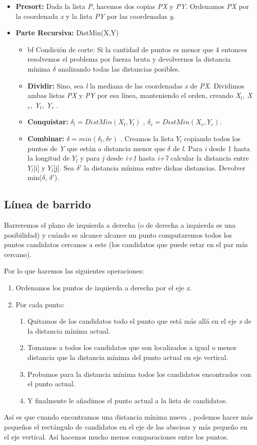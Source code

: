 \begin{itemize}
	\item {\bf Presort:} Dada la lista {\em P}, hacemos dos copias {\em PX} y {\em PY}. Ordenamos {\em PX} por la coordenada {\em x} y la lista {\em PY} por las coordenadas {\em y}.
	\item {\bf Parte Recursiva:} DistMin(X,Y)
	\begin{itemize}
		\item {bf Condición de corte:} Si la cantidad de puntos es menor que 4 entonces resolvemos el problema por fuerza bruta y devolvernos la distancia mínima $\delta$ analizando todas las distancias posibles.
		\item {\bf Dividir:} Sino, sea {\em l} la mediana de las coordenadas {\em x} de {\em PX}. Dividimos ambas listas {\em PX} y {\em PY} por esa línea, manteniendo el orden, creando {\em X$_{l}$, X$_{r}$, Y$_{l}$, Y$_{r}$ }.
		\item {\bf Conquistar:} $\delta_{l}=DistMin(X_{l},Y_{l})$ , $\delta_{r}=DistMin(X_{r},Y_{r})$.
		\item {\bf Combinar:} $\delta=min(\delta_{l}, \delta{r})$ . Creamos la lista $Y_l$ copiando 
		todos los puntos de {\em Y} que están a distancia menor que $\delta$ de {\em l}. Para {\em i} 
		desde 1 hasta la longitud de $Y_l$ y para {\em j} desde {\em i+1} hasta {\em i+7} calcular 
		la distancia entre $Y_l$[i] y $Y_l$[j]. Sea $\delta'$ la distancia mínima entre dichas 
		distancias. Devolver min($\delta$, $\delta'$).
	\end{itemize}
\end{itemize}

\subsection{Línea de barrido}

Barreremos el plano de izquierda a derecha (o de derecha a izquierda es una posibilidad) y cuándo se alcance alcance un punto computaremos todos los puntos candidatos cercanos a este (los candidatos que puede estar en el par más cercano).

Por lo que haremos las siguientes operaciones:
\begin{enumerate}
	\item Ordenamos los puntos de izquierda a derecha por el eje {\em x}.
	\item Por cada punto:
	\begin{enumerate}
		\item Quitamos de los candidatos todo el punto que está más allá en el eje {\em x}  de la distancia mínima actual.
		\item Tomamos a todos los candidatos que son localizados a igual o menor distancia que la distancia mínima del punto actual en eje vertical.
		\item Probamos para la distancia mínima todos los candidatos encontrados con el punto actual.
		\item Y finalmente le añadimos el punto actual a la lista de candidatos.
	\end{enumerate}
\end{enumerate}

Así es que cuando encontramos una distancia mínima nueva , podemos hacer más pequeños el rectángulo de candidatos en el eje de las abscisas y más pequeño en el eje vertical. Así hacemos mucho menos comparaciones entre los puntos.